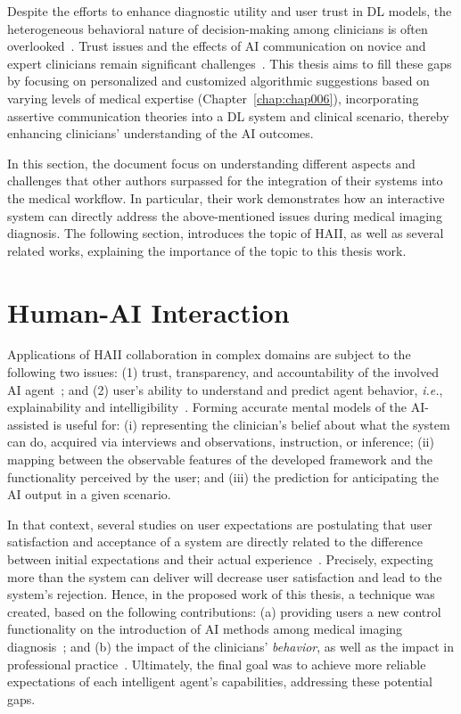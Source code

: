 Despite the efforts to enhance diagnostic utility and user trust in \ac{DL} models, the heterogeneous behavioral nature of decision-making among clinicians is often overlooked~\cite{10.1145/3290605.3300234, 10.1145/3359206}.
Trust issues and the effects of \ac{AI} communication on novice and expert clinicians remain significant challenges~\cite{10.1145/3544548.3580682, 10.1145/3491102.3502104}.
This thesis aims to fill these gaps by focusing on personalized and customized algorithmic suggestions based on varying levels of medical expertise (Chapter~\ref{chap:chap006}), incorporating assertive communication theories into a \ac{DL} system and clinical scenario, thereby enhancing clinicians' understanding of the \ac{AI} outcomes.

In this section, the document focus on understanding different aspects and challenges that other authors surpassed for the integration of their systems into the medical workflow.
In particular, their work demonstrates how an interactive system can directly address the above-mentioned issues during medical imaging diagnosis.
The following section, introduces the topic of \ac{HAII}, as well as several related works, explaining the importance of the topic to this thesis work.

\section{Human-AI Interaction}
\label{sec:chap003002}

Applications of \ac{HAII} collaboration in complex domains are subject to the following two issues:
(1) trust, transparency, and accountability of the involved \ac{AI} agent~\cite{10.1145/3290605.3300233}; and
(2) user's ability to understand and predict agent behavior, {\it i.e.}, explainability and intelligibility~\cite{Cai:2019:EEE:3301275.3302289}.
Forming accurate mental models of the \ac{AI}-assisted is useful for:
(i) representing the clinician's belief about what the system can do, acquired via interviews and observations, instruction, or inference;
(ii) mapping between the observable features of the developed framework and the functionality perceived by the user; and
(iii) the prediction for anticipating the \ac{AI} output in a given scenario.

In that context, several studies on user expectations are postulating that user satisfaction and acceptance of a system are directly related to the difference between initial expectations and their actual experience~\cite{Kocielnik:2019:YAI:3290605.3300641}.
Precisely, expecting more than the system can deliver will decrease user satisfaction and lead to the system's rejection.
Hence, in the proposed work of this thesis, a technique was created, based on the following contributions:
(a) providing users a new control functionality on the introduction of \ac{AI} methods among medical imaging diagnosis~\cite{pesapane2018artificial}; and
(b) the impact of the clinicians' {\it behavior}, as well as the impact in professional practice~\cite{CALISTO2021102607}.
Ultimately, the final goal was to achieve more reliable expectations of each intelligent agent's capabilities, addressing these potential gaps.

